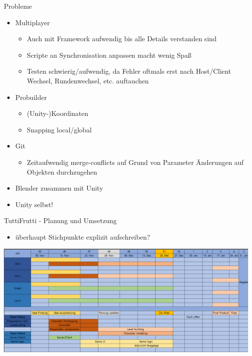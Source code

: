 \documentclass[xcolor=dvipsnames]{beamer}
\begin{document}
\begin{frame}{Probleme}
\begin{itemize}
 \item Multiplayer 
 	\begin{itemize}
 		\item Auch mit Framework aufwendig bis alle Details verstanden sind
 		\item Scripte an Synchronisation anpassen macht wenig Spaß
 		\item Testen schwierig/aufwendig, da Fehler oftmals erst nach Host/Client Wechsel, Rundenwechsel, etc. auftauchen
 	\end{itemize}
 \item Probuilder
 	\begin{itemize}
 		\item (Unity-)Koordinaten 
 		\item Snapping local/global
 	\end{itemize}
  \item Git
 	\begin{itemize}
 		\item Zeitaufwendig merge-conflicts auf Grund von Parameter Änderungen auf Objekten durchzugehen
 	\end{itemize}
  \item Blender zusammen mit Unity 
  \item Unity selbst!
\end{itemize}
	
\end{frame}

\begin{frame}{TuttiFrutti - Planung und Umsetzung}
\begin{itemize}
		\item überhaupt Stichpunkte explizit aufschreiben?
\end{itemize}
\begin{center}
		\includegraphics[width=1\textwidth]{ProjektPlanung_6times90.png}
\end{center}

\end{frame}
\end{document}
